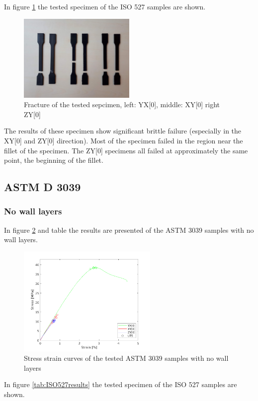In figure \ref{fig:ISO527specimen} the tested specimen of the ISO 527 samples are shown. 
\begin{figure}[H]
    \centering
    \includegraphics[width=0.50\textwidth]{chapter_5_Experimentaltesting/figures/imageISO.jpg}
    \caption{Fracture of the tested sepcimen, left: YX[0], middle: XY[0] right ZY[0]}
    \label{fig:ISO527specimen}
\end{figure}
The results of these specimen show significant brittle failure (especially in the XY[0] and ZY[0] direction). Most of the specimen failed in the region near the fillet of the specimen. The ZY[0] specimens all failed at approximately the same point, the beginning of the fillet. 

\subsection{ASTM D 3039}
\subsubsection{No wall layers }
In figure \ref{fig:ASTM3039results} and table \label{tab:ASTM3039results} the results are presented of the ASTM 3039 samples with no wall layers.
\begin{figure}[H]
    \centering
    \includegraphics[width=0.60\textwidth]{chapter_5_Experimentaltesting/figures/ASTMnoTensiletests.png}
    \caption{Stress strain curves of the tested ASTM 3039 samples with no wall layers}
    \label{fig:ASTM3039results}
\end{figure}
In figure \ref{tab:ISO527results} the tested specimen of the ISO 527 samples are shown. 


